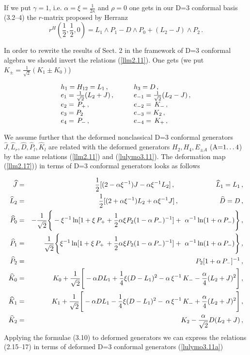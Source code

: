 \documentclass[a4paper,12pt,showkeys]{article}
\begin{document}


If we put  $ \gamma = 1$, i.e.
$\alpha = \xi = \frac{1}{2\kappa}$ and
 $\rho = 0$ one gets in our D=3 conformal basis
  (3.2--4) the $r$-matrix proposed  by Herranz
   \cite{ll8}
\begin{equation}\label{llm22.15}
  r^H (\frac{1}{2},\frac{1}{2}, 0) = L_1 \wedge P_1 - D \wedge
  P_0 + (L_2 - J ) \wedge P_2 \, .
\end{equation}


In order to rewrite the results
 of Sect. 2 in the framework of D=3 conformal
 algebra we should invert the relations (\ref{llm2.11}). One gets
  (we put $K_{\pm} = \frac{1}{\sqrt{2}} (K_1 \pm K_0)$)


\begin{equation}
 \label{lulymo3.11}
 \begin{array}{ll}
h_1 = H_{12} = L_1\, , \qquad
& h_3 = D \, ,
\cr
e_1 =\frac{1}{\sqrt{2}} (L_2 + J) \, ,
\qquad
 & e_{-1}= \frac{1}{\sqrt{2}} (L_2 -J)\, ,
 \cr
e_2 =
\, P_{+}
 \, ,
& e_{-2} =
 \, K_{-}
 \, ,
\cr
e_3 = P_2 & e_{-3} = K_2 \, ,
\cr
e_4  =
\,  P_{-}
\, ,
& e_{-4}  =
 \, K_{+}
 \, ,
 \end{array}
 \end{equation}


We assume further that the deformed
 nonclassical D=3 conformal generators $\widehat{J},
\widehat{L}_r, \widehat{D},\widehat{P}_l, \widehat{K}_l$ are related with the
deformed generators \sloppy $H_2, H_4, E_{\pm A}$ \sloppy ($\hbox{A=1\ldots 4}$)
 by the same relations (\ref{llm2.11}) and (\ref{lulymo3.11}).
The deformation map (\ref{llm2.17}))
 in terms of D=3 conformal generators looks as follows

\begin{eqnarray}\label{lulymo3.11a}
  \widehat{J}&= &
  \frac{1}{2} [ (2 -\alpha \xi^{-1} ) J - \alpha\xi^{-1}
  L_2  ] \, , \qquad \qquad\qquad \widehat{L}_1 = L_1 \, ,
  \cr
  \widehat{L}_2 &=& \frac{1}{2} [ (2 + \alpha \xi^{-1} ) L_2
   + \alpha\xi^{-1}  J  ]
    \, , \qquad\qquad \qquad \widehat{D} = D \, ,
\cr
\widehat{P}_0 &=& -\frac{1 }{\sqrt{2}}
 \Bigg\{-  \xi^{-1} \ln
 [ 1 +
 \xi \, P_{+}  +
 \frac{1}{2} \alpha \xi P_2 (1
 -
 \alpha \, P_{-})^{-1}]
+\ \alpha^{-1} \ln (1 +
\alpha \, P_{-} )\Bigg\}\, ,
    \cr
\widehat{P}_1 &= &\frac{ 1}{\sqrt{2}} \Bigg\{ \xi^{-1} \ln
 [ 1 +
 \xi \, P_{+} \,
 +
 \frac{1}{2} \alpha \xi P_2 (1
 -
 \alpha \, P_{-})^{-1}]
  + \ \alpha^{-1} \ln (1 +
 \alpha \, P_{-}
 )\Bigg\}\, ,
\cr
    \widehat{P}_2 &= & P_2
      [ 1 +
      \alpha \, P_{-} ]^{-1} \, ,
\cr
\widehat{K}_0 & = & K_0 +
 \frac{1 }{\sqrt{2}} \Bigg[ - \alpha DL_1 +
\frac{1 }{4} \xi (D- L_1)^2
 -
  \alpha
\, \xi^{-1}
 \, K_{-}
 -
\frac{\alpha }{4}(L_2 +J)^2\Bigg]\, ,
\cr
\widehat{K}_1 & = & K_1 + \frac{1 }{\sqrt{2}}
\Bigg[ - \alpha DL_1 -
\frac{1 }{4} \xi (D-L_1)^2
-
 \, \alpha
\, \xi^{-1}
 \, K_{-}
+
\frac{\alpha }{4}(L_2 +J)^2\Bigg]\, ,
\cr
\widehat{K}_2
 & = &  K_2 -
 \frac{\alpha}{\sqrt{2}} D(L_2 + J) \, ,
 \end{eqnarray}
Applying the formulae (3.10) to deformed generators we can
express the relations (2.15--17) in terms of deformed D=3
 conformal generators (\ref{lulymo3.11a})
\end{document}
